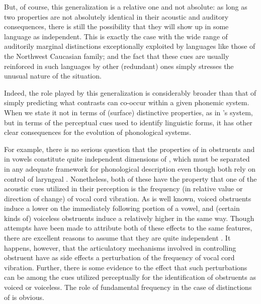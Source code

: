 But, of course, this generalization is a relative one and not
absolute: as long as two properties are not absolutely identical in
their acoustic and auditory consequences, there is still the
possibility that they will show up in some language as
independent. This is exactly the case with the wide range of
auditorily marginal distinctions exceptionally exploited by languages
like those of the Northwest Caucasian family; and the fact that these
cues are usually reinforced in such languages by other (redundant)
ones simply stresses the unusual nature of the situation.

Indeed, the role played by this generalization is considerably broader
than that of simply predicting what contrasts can co-occur within a
given phonemic system. When we state it not in terms of (surface)
distinctive properties, as in {\Jakobson}'s system, but in terms of the
perceptual cues used to identify linguistic forms, it has other clear
consequences for the evolution of phonological systems.

For example, there is no serious question that the properties of
 in obstruents and  in vowels constitute quite independent
dimensions of , which must be separated in any adequate
framework for phonological description even though both rely on
control of laryngeal . Nonetheless, both of these have the
property that one of the acoustic cues utilized in their perception is
the frequency (in relative value or direction of change) of vocal cord
vibration. As is well known, voiced obstruents induce a lower  on
the immediately following portion of a vowel, and (certain kinds of)
voiceless obstruents induce a relatively higher  in the same
way. Though attempts have been made to attribute both of these effects
to the same features, there are excellent reasons to assume that they
are quite independent \citep{sra78:tone_features,tang08:tone}.  It
happens, however, that the articulatory mechanisms involved in
controlling obstruent  have as side effects a perturbation of
the frequency of vocal cord vibration. Further, there is some evidence
to the effect that such perturbations can be among the cues utilized
perceptually for the identification of obstruents as voiced or
voiceless. The role of fundamental frequency in the case of
distinctions of  is obvious.

